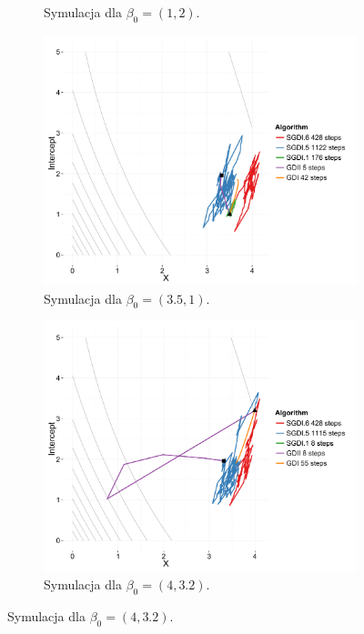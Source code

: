 \begin{figure}[h!]
\begin{center}
\begin{subfigure}[h!]{0.45\textwidth}
        \caption{Symulacja dla $\beta_0 = (1,2)$.}
      \end{subfigure}
   \begin{subfigure}[h!]{0.45\textwidth}
           \includegraphics[width=\textwidth]{Obrazki/contour_35_1.pdf}
           \caption{Symulacja dla $\beta_0 = (3.5,1)$.}
                 \end{subfigure}
   \begin{subfigure}[h!]{0.45\textwidth}
              \includegraphics[width=\textwidth]{Obrazki/contour_4_32.pdf}
              \caption{Symulacja dla $\beta_0 = (4,3.2)$.}

\end{subfigure}
\end{center}
\end{figure}
